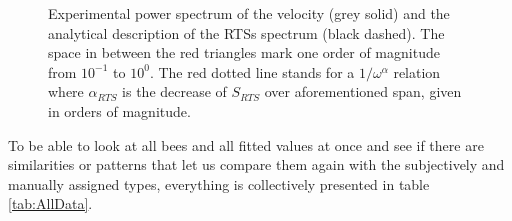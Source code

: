 \begin{figure}%
    \centering
    \caption{Experimental power spectrum of the velocity (grey solid) and the analytical description of the RTSs spectrum (black dashed). The space in between the red triangles mark one order of magnitude from $10^{-1}$ to $10^0$. The red dotted line stands for a $1/\omega^{\alpha}$ relation where $\alpha_{RTS}$ is the decrease of $S_{RTS}$ over aforementioned span, given in orders of magnitude.}  
    \label{fig:RTS_PSD_16}
\end{figure}

To be able to look at all bees and all fitted values at once and see if there are similarities or patterns that let us compare them again with the subjectively and manually assigned types, everything is collectively presented in table \ref{tab:AllData}.

